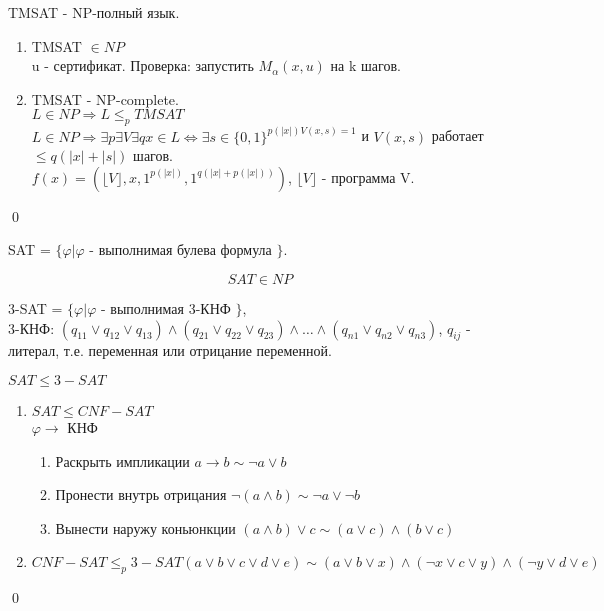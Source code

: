 \documentclass{article}
\begin{document}
	\begin{theorem}
		TMSAT - NP-полный язык.
		\proof
		\begin{enumerate}
			\item TMSAT $\in NP$\\
			u - сертификат. Проверка: запустить $M_{\alpha}(x,u)$ на k шагов.
			
			\item TMSAT - NP-complete.\\
			$L \in NP \Rightarrow L \le_p TMSAT$\\
			$L \in NP \Rightarrow \exists p \exists V \exists q x \in L \Leftrightarrow \exists s \in \{0,1\}^{p(|x|) V(x,s) = 1}$
			и $V(x,s)$ работает $\le q(|x| + |s|)$ шагов.\\
			$f(x) = (\lfloor V \rfloor,x,1^{p(|x|)},1^{q(|x| + p(|x|))})$, $\lfloor V \rfloor$ - программа V.
		\end{enumerate}
		\qed
	\end{theorem}
	
	\begin{definition}
		SAT = $\{\varphi | \varphi$ - выполнимая булева формула $\}$.
	\end{definition}
	$$SAT \in NP$$
	
	\begin{definition}
		3-SAT = $\{ \varphi | \varphi$ - выполнимая 3-КНФ $\}$, \\
		3-КНФ: $(q_{11} \vee q_{12} \vee q_{13}) \wedge (q_{21} \vee q_{22} \vee q_{23}) \wedge \ldots \wedge (q_{n1} \vee q_{n2} \vee q_{n3})$,
		$q_{ij}$ - литерал, т.е. переменная или отрицание переменной.
	\end{definition}
	
	\begin{statement}
		$SAT \le 3-SAT$
		\proof
		\begin{enumerate}
			\item $SAT \le CNF-SAT$\\
			$\varphi \to$ КНФ
			\begin{enumerate}
				\item Раскрыть импликации $a \to b \sim \neg a \vee b $
				\item Пронести внутрь отрицания $\neg(a \wedge b) \sim \neg a \vee \neg b$
				\item Вынести наружу коньюнкции $(a \wedge b) \vee c \sim (a \vee c) \wedge (b \vee c)$
			\end{enumerate}
			
			\item $CNF - SAT \le_p 3-SAT (a \vee b \vee c \vee d \vee e) \sim (a \vee b \vee x) \wedge (\neg x \vee c \vee y) \wedge (\neg y \vee d \vee e)$
		\end{enumerate}
	\end{statement}
	\qed
	
\end{document}
